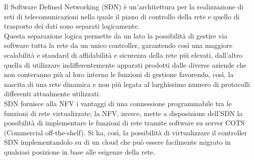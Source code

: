\documentclass{article}
\begin{document}
		Il Software Defined Networking (SDN) è un’architettura per la realizzazione di reti di telecomunicazioni nella quale il piano di controllo della rete e quello di trasporto dei dati sono separati logicamente.\\
		Questa separazione logica permette da un lato la possibilità di gestire via software tutta la rete da un unico controller, garantendo così una maggiore scalabilità e standard di affidabilità e sicurezza della rete più elevati, dall’altro quella di utilizzare indifferentemente apparati prodotti dalle diverse aziende che non conteranno più al loro interno le funzioni di gestione favorendo, così, la nascita di una rete dinamica e non più legata al larghissimo numero di protocolli differenti attualmente utilizzati.\\
		SDN fornisce alla NFV i vantaggi di una connessione programmabile tra le funzioni di rete virtualizzate; la NFV, invece, mette a disposizione dell’SDN la possibilità di implementare le funzioni di rete tramite software su server COTS (Commercial off-the-shelf). Si ha, così, la possibilità di virtualizzare il controller SDN implementandolo su di un cloud che può essere facilmente migrato in qualsiasi posizione in base alle esigenze della rete.
\end{document}
